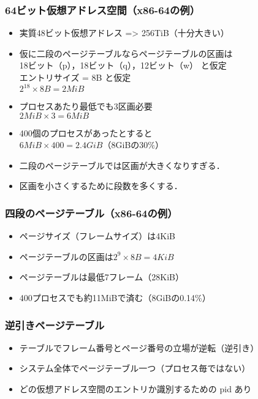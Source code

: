 \documentclass{beamer}                   %
\begin{document}
\begin{frame}
  \frametitle{64ビット仮想アドレス空間（x86-64の例）}
  \begin{itemize}
  \item 実質48ビット仮想アドレス => 256TiB（十分大きい）
  \item 仮に二段のページテーブルならページテーブルの区画は \\
    18ビット（p），18ビット（q），12ビット（w） と仮定 \\
    エントリサイズ = 8B  と仮定 \\
    $2^{18} \times 8B = 2MiB$
  \item プロセスあたり最低でも3区画必要 \\
    $2MiB \times 3 = 6MiB$
  \item 400個のプロセスがあったとすると \\
    $6MiB \times 400 = 2.4GiB$（8GiBの30\%）
  \item 二段のページテーブルでは区画が大きくなりすぎる．
  \item 区画を小さくするために段数を多くする．
  \end{itemize}
\end{frame}

\begin{frame}
  \frametitle{四段のページテーブル（x86-64の例）}
  \begin{itemize}
  \item ページサイズ（フレームサイズ）は4KiB
  \item ページテーブルの区画は$2^9 \times 8B = 4KiB$
  \item ページテーブルは最低7フレーム（28KiB）
  \item 400プロセスでも約11MiBで済む（8GiBの0.14\%）
  \end{itemize}
\end{frame}

\begin{frame}
  \frametitle{逆引きページテーブル}
  \begin{itemize}
  \item テーブルでフレーム番号とページ番号の立場が逆転（逆引き）
  \item システム全体でページテーブル一つ（プロセス毎ではない）
  \item どの仮想アドレス空間のエントリか識別するための pid あり
  \end{itemize}
\end{frame}
\end{document}
